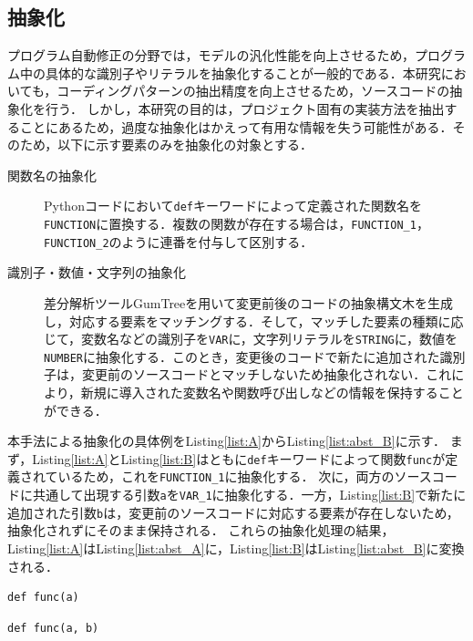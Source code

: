 \documentclass[11pt]{jreport}
\begin{document}
\subsection{抽象化}
プログラム自動修正の分野では，モデルの汎化性能を向上させるため，プログラム中の具体的な識別子やリテラルを抽象化することが一般的である．本研究においても，コーディングパターンの抽出精度を向上させるため，ソースコードの抽象化を行う．
しかし，本研究の目的は，プロジェクト固有の実装方法を抽出することにあるため，過度な抽象化はかえって有用な情報を失う可能性がある．そのため，以下に示す要素のみを抽象化の対象とする．
\begin{description}
    \item[関数名の抽象化] Pythonコードにおいて\texttt{def}キーワードによって定義された関数名を\texttt{FUNCTION}に置換する．複数の関数が存在する場合は，\texttt{FUNCTION\_1}，\texttt{FUNCTION\_2}のように連番を付与して区別する．
    \item[識別子・数値・文字列の抽象化] 差分解析ツールGumTree\cite{gumtree}を用いて変更前後のコードの抽象構文木を生成し，対応する要素をマッチングする．そして，マッチした要素の種類に応じて，変数名などの識別子を\texttt{VAR}に，文字列リテラルを\texttt{STRING}に，数値を\texttt{NUMBER}に抽象化する．このとき，変更後のコードで新たに追加された識別子は，変更前のソースコードとマッチしないため抽象化されない．これにより，新規に導入された変数名や関数呼び出しなどの情報を保持することができる．
\end{description}

本手法による抽象化の具体例をListing\ref{list:A}からListing\ref{list:abst_B}に示す．
まず，Listing\ref{list:A}とListing\ref{list:B}はともに\texttt{def}キーワードによって関数\texttt{func}が定義されているため，これを\texttt{FUNCTION\_1}に抽象化する．
次に，両方のソースコードに共通して出現する引数\texttt{a}を\texttt{VAR\_1}に抽象化する．一方，Listing\ref{list:B}で新たに追加された引数\texttt{b}は，変更前のソースコードに対応する要素が存在しないため，抽象化されずにそのまま保持される．
これらの抽象化処理の結果，Listing\ref{list:A}はListing\ref{list:abst_A}に，Listing\ref{list:B}はListing\ref{list:abst_B}に変換される．

\begin{minipage}[b]{0.48\textwidth}
\begin{lstlisting}[caption=修正前ソースコード,label=list:A]
def func(a)
\end{lstlisting}
\end{minipage}
\begin{minipage}[b]{0.48\textwidth}
\begin{lstlisting}[caption=修正後ソースコード,label=list:B]
def func(a, b)
\end{lstlisting}
\end{minipage}
\end{document}
